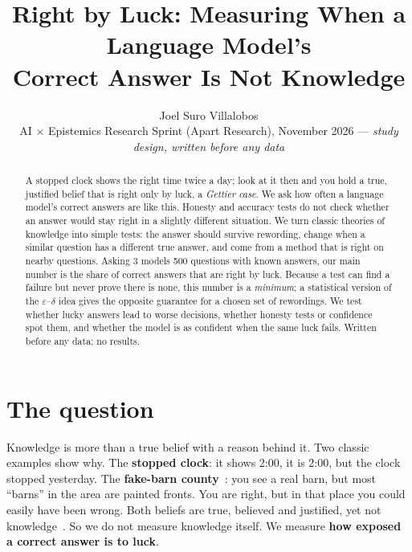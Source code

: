 \documentclass[10pt]{article}
\title{\vspace{-1.6em}\textbf{Right by Luck: Measuring When a Language Model's\\Correct Answer Is Not Knowledge}\vspace{-0.4em}}
\author{Joel Suro Villalobos\\{\small AI $\times$ Epistemics Research Sprint (Apart Research), November 2026 --- \textit{study design, written before any data}}}
\date{\vspace{-2.2em}}
\begin{document}
\maketitle

\begin{abstract}
\noindent A stopped clock shows the right time twice a day; look at it then and you hold a true, justified belief that is right only by luck, a \emph{Gettier case}. We ask how often a language model's correct answers are like this. Honesty and accuracy tests do not check whether an answer would stay right in a slightly different situation. We turn classic theories of knowledge into simple tests: the answer should survive rewording, change when a similar question has a different true answer, and come from a method that is right on nearby questions. Asking 3 models 500 questions with known answers, our main number is the share of correct answers that are right by luck. Because a test can find a failure but never prove there is none, this number is a \emph{minimum}; a statistical version of the $\varepsilon$--$\delta$ idea gives the opposite guarantee for a chosen set of rewordings. We test whether lucky answers lead to worse decisions, whether honesty tests or confidence spot them, and whether the model is as confident when the same luck fails. Written before any data; no results.
\end{abstract}

\section{The question}
Knowledge is more than a true belief with a reason behind it. Two classic examples show why. The \textbf{stopped clock}: it shows 2:00, it is 2:00, but the clock stopped yesterday. The \textbf{fake-barn county}~\cite{goldman76}: you see a real barn, but most ``barns'' in the area are painted fronts. You are right, but in that place you could easily have been wrong. Both beliefs are true, believed and justified, yet not knowledge~\cite{gettier}. So we do not measure knowledge itself. We measure \textbf{how exposed a correct answer is to luck}.
\end{document}
